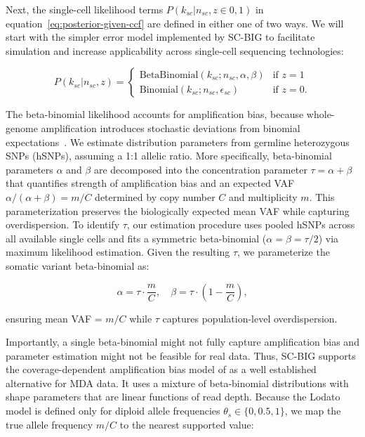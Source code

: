 \documentclass[10pt]{article}
\begin{document}
Next, the single-cell likelihood terms $P(k_{sc} | n_{sc}, z \in {0,1})$ in equation~\eqref{eq:posterior-given-ccf} are defined in either one of two ways.
We will start with the simpler error model implemented by SC-BIG to facilitate simulation and increase applicability across single-cell sequencing technologies:

\begin{equation}
    P(k_{sc} | n_{sc}, z) =
    \begin{cases}
        \text{BetaBinomial}(k_{sc}; n_{sc}, \alpha, \beta) & \text{if } z = 1 \\
        \text{Binomial}(k_{sc}; n_{sc}, \epsilon_{sc}) & \text{if } z = 0.
    \end{cases}
\label{eq:z-likelihood}
\end{equation}

The beta-binomial likelihood accounts for amplification bias, because whole-genome amplification introduces stochastic deviations from binomial expectations~\cite{dong2017,luquette2019}.
We estimate distribution parameters from germline heterozygous SNPs (hSNPs), assuming a 1:1 allelic ratio.
More specifically, beta-binomial parameters $\alpha$ and $\beta$ are decomposed into the concentration parameter $\tau = \alpha + \beta$ that quantifies strength of amplification bias and an expected VAF $\alpha/(\alpha+\beta) = m/C$ determined by copy number $C$ and multiplicity $m$.
This parameterization preserves the biologically expected mean VAF while capturing overdispersion.
To identify $\tau$, our estimation procedure uses pooled hSNPs across all available single cells and fits a symmetric beta-binomial ($\alpha = \beta = \tau/2$) via maximum likelihood estimation.
Given the resulting $\tau$, we parameterize the somatic variant beta-binomial as:

\begin{equation}
    \alpha = \tau \cdot \frac{m}{C}
    , \quad
    \beta = \tau \cdot \left(1 - \frac{m}{C}\right)
    ,
\label{eq:alpha-beta-from-tau}
\end{equation}

ensuring mean VAF = $m/C$ while $\tau$ captures population-level overdispersion.

Importantly, a single beta-binomial might not fully capture amplification bias and parameter estimation might not be feasible for real data.
Thus, SC-BIG supports the coverage-dependent amplification bias model of \textcite{lodato2015} as a well established alternative for MDA data.
It uses a mixture of beta-binomial distributions with shape parameters that are linear functions of read depth.
Because the Lodato model is defined only for diploid allele frequencies $\theta_s \in \{0, 0.5, 1\}$, we map the true allele frequency $m/C$ to the nearest supported value:
\end{document}
